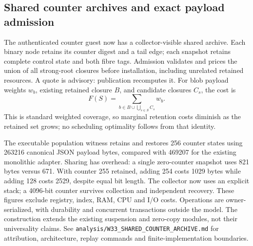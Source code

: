 \subsection{Shared counter archives and exact payload admission}
\label{subsec:shared-counter-archive}
The authenticated counter guest now has a collector-visible shared archive.
Each binary node retains its counter digest and a tail edge; each snapshot
retains complete control state and both fibre tags. Admission validates and
prices the union of all strong-root closures before installation, including
unrelated retained resources. A quote is advisory: publication recomputes it.
For blob payload weights $w_b$, existing retained closure $B$, and candidate
closures $C_s$, the cost is
\[
 F(S)=\sum_{b\in B\cup\bigcup_{s\in S}C_s}w_b.
\]
This is standard weighted coverage, so marginal retention costs diminish as
the retained set grows; no scheduling optimality follows from that identity.

The executable population witness retains and restores 256 counter states
using 263216 canonical JSON payload bytes, compared with 469207 for the
existing monolithic adapter. Sharing has overhead: a single zero-counter
snapshot uses 821 bytes versus 671. With counter 255 retained, adding 254
costs 1029 bytes while adding 128 costs 2529, despite equal bit length.
The collector now uses an explicit stack; a 4096-bit counter survives
collection and independent recovery. These figures exclude registry, index,
RAM, CPU and I/O costs. Operations are owner-serialized, with durability and
concurrent transactions outside the model. The construction extends the
existing suspension and zero-copy modules, not their universality claims.
See \texttt{analysis/W33\_SHARED\_COUNTER\_ARCHIVE.md} for attribution,
architecture, replay commands and finite-implementation boundaries.
